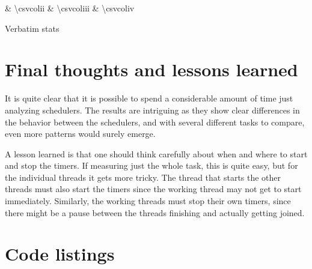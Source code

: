 \documentclass[12pt, a4paper]{article} %
\begin{document}
\begin{table}[ht]
	\centering
	{\csvcoli & \num{\csvcolii} & \num{\csvcoliii} & \num{\csvcoliv}}
	\caption{Verbatim stats}
	\label{verbatim}
\end{table}


\section{Final thoughts and lessons learned}

It is quite clear that it is possible to spend a considerable amount of time just analyzing schedulers.
The results are intriguing as they show clear differences in the behavior between the schedulers, and with several different tasks to compare, even more patterns would surely emerge.

A lesson learned is that one should think carefully about when and where to start and stop the timers.
If measuring just the whole task, this is quite easy, but for the individual threads it gets more tricky.
The thread that starts the other threads must also start the timers since the working thread may not get to start immediately.
Similarly, the working threads must stop their own timers, since there might be a pause between the threads finishing and actually getting joined.

\clearpage
\appendix

\section{Code listings}


















\end{document}
